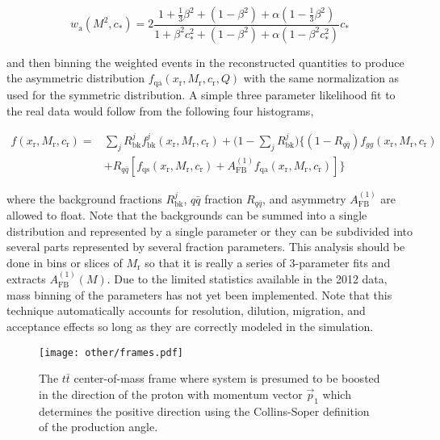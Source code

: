 \documentclass{cmspaperpdf}
\begin{document}
\begin{equation}
w_\mathrm{a}(M^2, c_*) = 2\frac{1+\frac{1}{3}\beta^2+(1-\beta^2)+\alpha(1-\frac{1}{3}\beta^2)}{1+\beta^2c_*^2+\left(1-\beta^2\right)+\alpha\left(1-\beta^2c_*^2\right)}c_*
\end{equation}

and then binning the weighted events in the reconstructed quantities to produce the asymmetric distribution $f_\mathrm{qa}(x_\mathrm{r}, M_\mathrm{r}, c_\mathrm{r}, Q)$ with the same normalization as used for the symmetric distribution.  A simple three parameter likelihood fit to the real data would follow from the following four histograms,

\begin{align}
f(x_\mathrm{r},M_\mathrm{r},c_\mathrm{r}) =& \sum_jR^j_\mathrm{bk}f^j_\mathrm{bk}(x_\mathrm{r},M_\mathrm{r},c_\mathrm{r})+\biggl(1-\sum_jR^j_\mathrm{bk}\biggr )\biggl\lbrace \left(1-R_{q\bar q}\right) f_{gg}(x_\mathrm{r},M_\mathrm{r},c_\mathrm{r})\nonumber \\ &+R_{q\bar q}\left[f_\mathrm{qs}(x_\mathrm{r}, M_\mathrm{r}, c_\mathrm{r})+A_\mathrm{FB}^{(1)}f_\mathrm{qa}(x_\mathrm{r}, M_\mathrm{r}, c_\mathrm{r})\right]\biggr\rbrace
\label{eq:template_schemeone}
\end{align}

where the background fractions $R^j_\mathrm{bk}$, $q\bar q$ fraction $R_{q\bar q}$, and asymmetry $A_\mathrm{FB}^{(1)}$ are allowed to float.  Note that the backgrounds can be summed into a single distribution and represented by a single parameter or they can be subdivided into several parts represented by several fraction parameters.  This analysis should be done in bins or slices of $M_\mathrm{r}$ so that it is really a series of 3-parameter fits and extracts $A_\mathrm{FB}^{(1)}(M)$.  Due  to the limited statistics available in the 2012 data, mass binning of the parameters has not yet been implemented.  Note that this technique automatically accounts for resolution, dilution, migration, and acceptance effects so long as they are correctly modeled in the simulation.

\begin{figure}[hbt]
  \begin{center}
    \texttt{[image: other/frames.pdf]}
  \caption{\small The $t\bar t$ center-of-mass frame where system is presumed to be boosted in the direction of the proton with momentum vector $\vec p_1$ which determines the positive direction using the Collins-Soper definition of the production angle.}
    \label{fig:frames}
  \end{center}
\end{figure}
\end{document}
